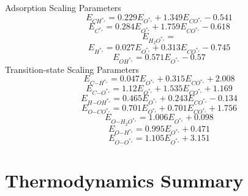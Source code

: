 \documentclass[a4paper,8pt]{report}
\begin{document}
Adsorption Scaling Parameters\\
\begin{equation}
\label{ads_scaling_1}
E_{CH^{*_s}} = 0.229E_{O^{*_s}} + 1.349E_{CO^{*_s}} - 0.541
\end{equation}
\begin{equation}
\label{ads_scaling_2}
E_{C^{*_s}} = 0.284E_{O^{*_s}} + 1.759E_{CO^{*_s}} - 0.618
\end{equation}
\begin{equation}
\label{ads_scaling_3}
E_{H_{2}O^{*_s}} = 
\end{equation}
\begin{equation}
\label{ads_scaling_4}
E_{H^{*_s}} = 0.027E_{O^{*_s}} + 0.313E_{CO^{*_s}} - 0.745
\end{equation}
\begin{equation}
\label{ads_scaling_5}
E_{OH^{*_s}} = 0.571E_{O^{*_s}} - 0.57
\end{equation}
Transition-state Scaling Parameters\\
\begin{equation}
\label{TS_scaling_1}
E_{C\mathrm{-}H^{*_s}} = 0.047E_{O^{*_s}} + 0.315E_{CO^{*_s}} + 2.008
\end{equation}
\begin{equation}
\label{TS_scaling_2}
E_{C\mathrm{-}O^{*_s}} = 1.12E_{O^{*_s}} + 1.535E_{CO^{*_s}} + 1.169
\end{equation}
\begin{equation}
\label{TS_scaling_3}
E_{H\mathrm{-}OH^{*_s}} = 0.465E_{O^{*_s}} + 0.243E_{CO^{*_s}} - 0.134
\end{equation}
\begin{equation}
\label{TS_scaling_4}
E_{O\mathrm{-}CO^{*_s}} = 0.701E_{O^{*_s}} + 0.701E_{CO^{*_s}} + 1.756
\end{equation}
\begin{equation}
\label{TS_scaling_5}
E_{O\mathrm{-}H_{2}O^{*_s}} = 1.006E_{O^{*_s}} + 0.098
\end{equation}
\begin{equation}
\label{TS_scaling_6}
E_{O\mathrm{-}H^{*_s}} = 0.995E_{O^{*_s}} + 0.471
\end{equation}
\begin{equation}
\label{TS_scaling_7}
E_{O\mathrm{-}O^{*_s}} = 1.105E_{O^{*_s}} + 3.151
\end{equation}\section{Thermodynamics Summary}
\end{document}
